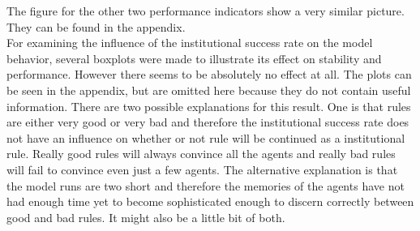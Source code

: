 \documentclass[a4paper]{article}
\begin{document}
The figure for the other two performance indicators show a very similar picture. They can be found in the appendix.\\
For examining the influence of the institutional success rate on the model behavior, several boxplots were made to illustrate its 
effect on stability and performance. However there seems to be absolutely no effect at all. The plots can be seen in the appendix, but are
omitted here because they do not contain useful information. There are two possible explanations for this result. One is that 
rules are either very good or very bad and therefore the institutional success rate does not have an influence on 
whether or not rule will be continued as a institutional rule. Really good rules will always convince all the agents and really bad 
rules will fail to convince even just a few agents. The alternative explanation is that the model runs are two short and therefore 
the memories of the agents have not had enough time yet to become sophisticated enough to discern correctly between good and bad rules.
It might also be a little bit of both.
\clearpage
\end{document}
